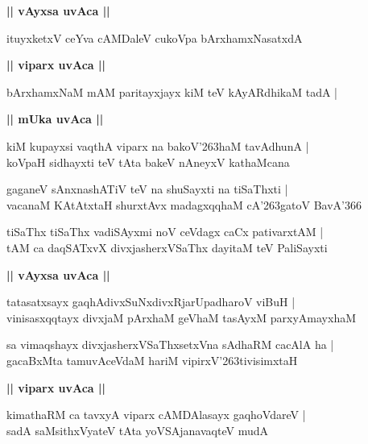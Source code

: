 \documentclass[twoside,12pt,openright]{book}
\def\S{\char'263}
\newcounter{shloka}[chapter]
\def\uvaca#1{\centerline{{\large\textbf{#1}}}}
\begin{document}
\uvaca{|| vAyxsa uvAca ||}

\begin{shloka}%
ituyxketxV ceYva cAMDaleV cukoVpa bArxhamxNasatxdA
\end{shloka}

\uvaca{|| viparx uvAca ||}

\begin{shloka}%
bArxhamxNaM mAM paritayxjayx kiM teV kAyARdhikaM tadA |\\
\end{shloka}

\uvaca{|| mUka uvAca ||}

\begin{shloka}%
kiM kupayxsi vaqthA viparx na bakoV\S haM tavAdhunA |\\
koVpaH sidhayxti teV tAta bakeV nAneyxV kathaMcana 
\end{shloka}

\begin{shloka}%
gaganeV sAnxnashATiV teV na shuSayxti na tiSaThxti |\\
vacanaM KAtAtxtaH shurxtAvx madagxqqhaM cA\S gatoV BavA\char'366
\end{shloka}

\begin{shloka}%
tiSaThx tiSaThx vadiSAyxmi noV ceVdagx caCx pativarxtAM |\\
tAM ca daqSATxvX divxjasherxVSaThx dayitaM teV PaliSayxti
\end{shloka}

\uvaca{|| vAyxsa uvAca ||}

\begin{shloka}%
tatasatxsayx gaqhAdivxSuNxdivxRjarUpadharoV viBuH |\\
vinisasxqqtayx divxjaM pArxhaM geVhaM  tasAyxM parxyAmayxhaM 
\end{shloka}

\begin{shloka}%
sa vimaqshayx divxjasherxVSaThxsetxVna sAdhaRM cacAlA ha |\\
gacaBxMta tamuvAceVdaM hariM vipirxV\S tivisimxtaH 
\end{shloka}

\uvaca{|| viparx uvAca ||}

\begin{shloka}%
kimathaRM ca tavxyA viparx cAMDAlasayx gaqhoVdareV |\\
sadA saMsithxVyateV tAta yoVSAjanavaqteV mudA
\end{shloka}
\end{document}
